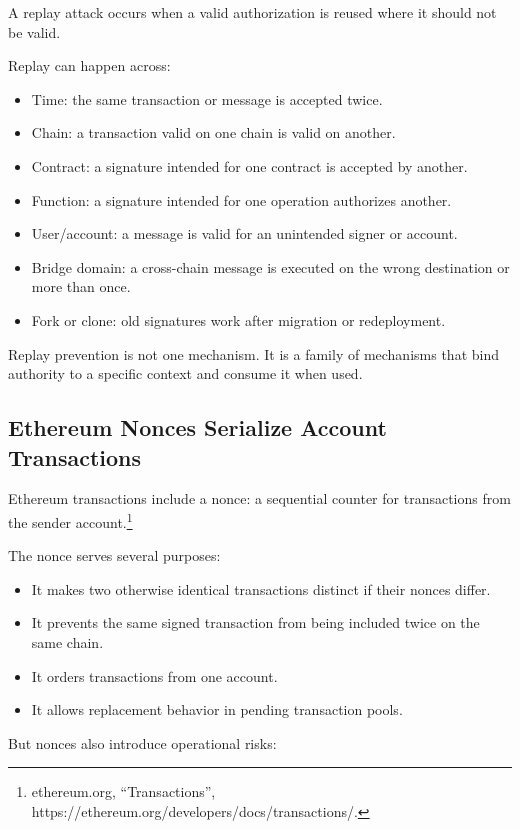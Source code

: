A replay attack occurs when a valid authorization is reused where it
should not be valid.

Replay can happen across:

\begin{itemize}
\tightlist
\item
  Time: the same transaction or message is accepted twice.
\item
  Chain: a transaction valid on one chain is valid on another.
\item
  Contract: a signature intended for one contract is accepted by
  another.
\item
  Function: a signature intended for one operation authorizes another.
\item
  User/account: a message is valid for an unintended signer or account.
\item
  Bridge domain: a cross-chain message is executed on the wrong
  destination or more than once.
\item
  Fork or clone: old signatures work after migration or redeployment.
\end{itemize}

Replay prevention is not one mechanism. It is a family of mechanisms
that bind authority to a specific context and consume it when used.

\subsection{Ethereum Nonces Serialize Account Transactions}

Ethereum transactions include a nonce: a sequential counter for
transactions from the sender account.\footnote{ethereum.org,
  ``Transactions'', https://ethereum.org/developers/docs/transactions/.}

The nonce serves several purposes:

\begin{itemize}
\tightlist
\item
  It makes two otherwise identical transactions distinct if their nonces
  differ.
\item
  It prevents the same signed transaction from being included twice on
  the same chain.
\item
  It orders transactions from one account.
\item
  It allows replacement behavior in pending transaction pools.
\end{itemize}

But nonces also introduce operational risks:

